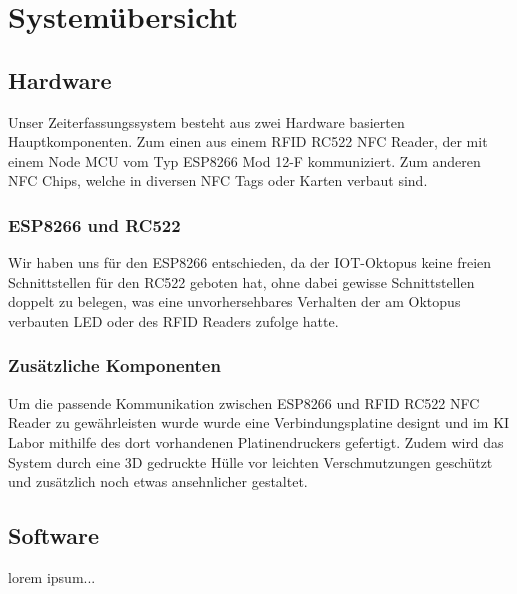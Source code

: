 \documentclass[../main.tex]{subfiles}
\begin{document}
\section{Systemübersicht}

\subsection{Hardware}
Unser Zeiterfassungssystem besteht aus zwei Hardware basierten Hauptkomponenten. Zum einen aus einem RFID RC522 NFC Reader, der mit einem Node MCU vom Typ ESP8266 Mod 12-F kommuniziert. Zum anderen NFC Chips, welche in diversen NFC Tags oder Karten verbaut sind.

\subsubsection{ESP8266 und RC522}
Wir haben uns für den ESP8266 entschieden, da der IOT-Oktopus keine freien Schnittstellen für den RC522 geboten hat, ohne dabei gewisse Schnittstellen doppelt zu belegen, was eine unvorhersehbares Verhalten der am Oktopus verbauten LED oder des RFID Readers zufolge hatte.

\subsubsection{Zusätzliche Komponenten}
Um die passende Kommunikation zwischen ESP8266 und RFID RC522 NFC Reader zu gewährleisten wurde wurde eine Verbindungsplatine designt und im KI Labor mithilfe des dort vorhandenen Platinendruckers gefertigt. Zudem wird das System durch eine 3D gedruckte Hülle vor leichten Verschmutzungen geschützt und zusätzlich noch etwas ansehnlicher gestaltet. 

\subsection{Software}
lorem ipsum...
\end{document}
